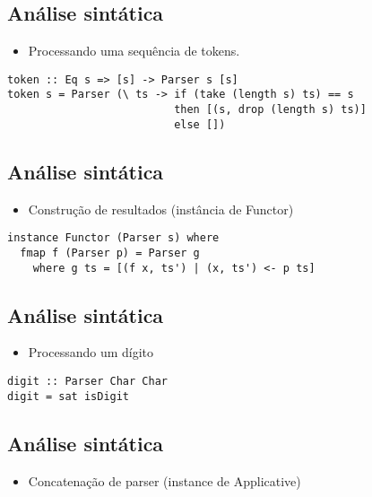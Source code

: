 \documentclass[11pt]{article}
\begin{document}
\subsection*{Análise sintática}
\label{sec:org05d2c87}

\begin{itemize}
\item Processando uma sequência de tokens.
\end{itemize}

\begin{verbatim}
token :: Eq s => [s] -> Parser s [s]
token s = Parser (\ ts -> if (take (length s) ts) == s 
                          then [(s, drop (length s) ts)]
                          else [])
\end{verbatim}
\subsection*{Análise sintática}
\label{sec:org9e1e943}

\begin{itemize}
\item Construção de resultados (instância de Functor)
\end{itemize}

\begin{verbatim}
instance Functor (Parser s) where 
  fmap f (Parser p) = Parser g 
    where g ts = [(f x, ts') | (x, ts') <- p ts]
\end{verbatim}
\subsection*{Análise sintática}
\label{sec:org3ab53ac}

\begin{itemize}
\item Processando um dígito
\end{itemize}

\begin{verbatim}
digit :: Parser Char Char 
digit = sat isDigit
\end{verbatim}
\subsection*{Análise sintática}
\label{sec:org3e796b1}

\begin{itemize}
\item Concatenação de parser (instance de Applicative)
\end{itemize}
\end{document}
